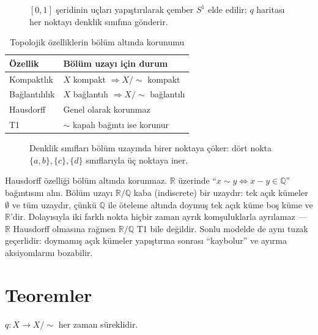 \begin{figure}[ht]
\centering

\caption{$[0,1]$ şeridinin uçları yapıştırılarak çember $S^1$ elde edilir;
$q$ haritası her noktayı denklik sınıfına gönderir.}
\end{figure}

\begin{table}[h]
\centering
\begin{tabular}{ll}
\toprule
\textbf{Özellik} & \textbf{Bölüm uzayı için durum} \\
\midrule
Kompaktlık & $X$ kompakt $\Rightarrow X/{\sim}$ kompakt \\
Bağlantılılık & $X$ bağlantılı $\Rightarrow X/{\sim}$ bağlantılı \\
Hausdorff & Genel olarak korunmaz \\
T1 & $\sim$ kapalı bağıntı ise korunur \\
\bottomrule
\end{tabular}
\caption{Topolojik özelliklerin bölüm altında korunumu}
\end{table}

\begin{figure}[ht]
\centering

\caption{Denklik sınıfları bölüm uzayında birer noktaya çöker: dört nokta
$\{a,b\}, \{c\}, \{d\}$ sınıflarıyla üç noktaya iner.}
\end{figure}

\begin{karsiornek}
Hausdorff özelliği bölüm altında korunmaz. $\mathbb{R}$ üzerinde
``$x \sim y \iff x - y \in \mathbb{Q}$'' bağıntısını alın. Bölüm uzayı
$\mathbb{R}/\mathbb{Q}$ kaba (indiscrete) bir uzaydır: tek açık kümeler
$\emptyset$ ve tüm uzaydır, çünkü $\mathbb{Q}$ ile öteleme altında doymuş tek
açık küme boş küme ve $\mathbb{R}$'dir. Dolayısıyla iki farklı nokta hiçbir
zaman ayrık komşuluklarla ayrılamaz --- $\mathbb{R}$ Hausdorff olmasına rağmen
$\mathbb{R}/\mathbb{Q}$ T1 bile değildir. Sonlu modelde de aynı tuzak geçerlidir:
doymamış açık kümeler yapıştırma sonrası ``kaybolur'' ve ayırma aksiyomlarını
bozabilir.
\end{karsiornek}

\section{Teoremler}

\begin{theorem}
$q: X \to X/{\sim}$ her zaman süreklidir.
\end{theorem}

